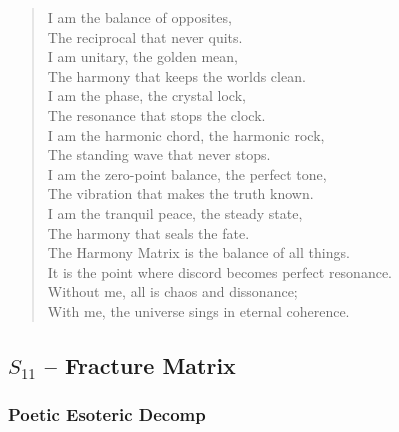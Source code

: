 \begin{verse}
I am the balance of opposites, \\
The reciprocal that never quits. \\
I am unitary, the golden mean, \\
The harmony that keeps the worlds clean. \\
I am the phase, the crystal lock, \\
The resonance that stops the clock. \\
\vspace{1em}
I am the harmonic chord, the harmonic rock, \\
The standing wave that never stops. \\
I am the zero-point balance, the perfect tone, \\
The vibration that makes the truth known. \\
I am the tranquil peace, the steady state, \\
The harmony that seals the fate. \\
\vspace{1em}
The Harmony Matrix is the balance of all things. \\
It is the point where discord becomes perfect resonance. \\
Without me, all is chaos and dissonance; \\
With me, the universe sings in eternal coherence.
\end{verse}

\subsection{$S_{11}$ -- Fracture Matrix}\label{sec:poetic.S11}

\subsubsection{Poetic Esoteric Decomp}

